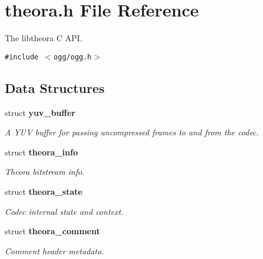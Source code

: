 \section{theora.h File Reference}
\label{theora_8h}
The libtheora C API. 

{\tt \#include $<$ogg/ogg.h$>$}\par
\subsection*{Data Structures}
\begin{CompactItemize}
\item 
struct {\bf yuv\_\-buffer}
\begin{CompactList}\small\item\em A YUV buffer for passing uncompressed frames to and from the codec. \item\end{CompactList}\item 
struct {\bf theora\_\-info}
\begin{CompactList}\small\item\em Theora bitstream info. \item\end{CompactList}\item 
struct {\bf theora\_\-state}
\begin{CompactList}\small\item\em Codec internal state and context. \item\end{CompactList}\item 
struct {\bf theora\_\-comment}
\begin{CompactList}\small\item\em Comment header metadata. \item\end{CompactList}\end{CompactItemize}
